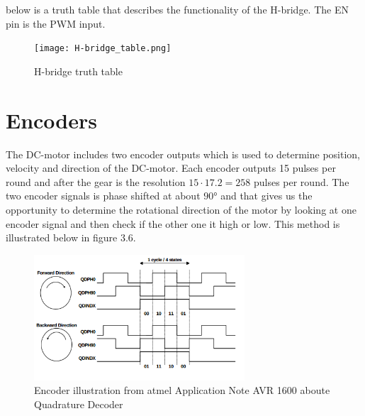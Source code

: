  below is a truth table that describes the functionality of the H-bridge. The EN pin is the PWM input.  

  \begin{figure}[!h!]
	\centering
	\texttt{[image: H-bridge\_table.png]}
	\caption{H-bridge truth table}
	\label{fig:intro_4}
\end{figure}

\newpage
\section{Encoders}
  The DC-motor includes two encoder outputs which is used to determine position, velocity and direction of the DC-motor.
  Each encoder outputs 15 pulses per round and after the gear is the resolution $15 \cdot 17.2 = 258$ pulses per round.
  The two encoder signals is phase shifted at about $\ang{90}$ and that gives us the opportunity to determine the rotational direction of the motor by looking at one encoder signal and then check if the other one it high or low. This method is illustrated below in figure 3.6.
   
  \begin{figure}[!h!]
	\centering
	\includegraphics[width=0.7\textwidth]{resources/encoder_atmel.png}
	\caption{Encoder illustration from atmel Application Note AVR 1600 aboute Quadrature Decoder}
	\label{fig:5}
\end{figure}

